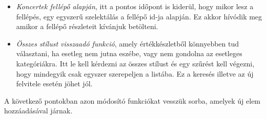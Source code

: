 \begin{itemize}
\item \textit{Koncertek fellépő alapján}, itt a pontos időpont is kiderül, hogy mikor lesz a fellépés, egy egyszerű szelektálás a fellépő id-ja alapján. Ez akkor hívódik meg amikor a fellépő részleteit kívánjuk betölteni.

\item \textit{Összes stílust visszaadó funkció}, amely értékkészletből könnyebben tud választani, ha esetleg nem jutna eszébe, vagy nem gondolna az esetleges kategóriákra. Itt le kell kérdezni az összes stílust és egy szűrést kell végezni, hogy mindegyik csak egyszer szerepeljen a listába. Ez a keresés illetve az új felvitele esetén jöhet jól.
\end{itemize}


A következő pontokban azon módosító funkciókat vesszük sorba, amelyek új elem hozzáadásával járnak.

